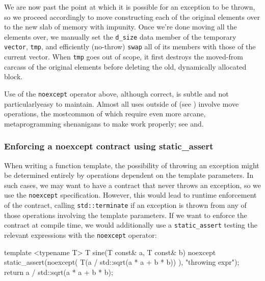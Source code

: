 We are now past the point at which it is possible for an exception to be
thrown, so we proceed accordingly to move constructing each of the
original elements over to the new slab of memory with impunity. Once
we're done moving all the elements over, we manually set the
\lstinline!d_size! data member of the temporary \lstinline!vector!,
\lstinline!tmp!, and efficiently (no-throw) \lstinline!swap! all of its
members with those of the current vector. When \lstinline!tmp! goes out of
scope, it first destroys the moved-from carcass of the original elements
before deleting the old, dynamically allocated block.

Use of the \lstinline!noexcept! operator above, although correct, is subtle
and not particularly\linebreak[4] easy to maintain. Almost all uses outside of
\linebreak[4] (see
) involve move operations, the
most\linebreak[4] common of which require even more arcane, metaprogramming
shenanigans to make work properly; see  and\linebreak[4] .

\subsubsection[Enforcing a \lstinline!noexcept! contract using \lstinline!static_assert!]{Enforcing a {\SubsubsecCode noexcept} contract using {\SubsubsecCode static\_assert}}\label{enforcing-a-noexcept-contract-using-static_assert}

When writing a function template, the possibility of throwing an
exception might be determined entirely by operations dependent on the
template parameters. In such cases, we may want to have a contract that
never throws an exception, so we use the \lstinline!noexcept!
specification. However, this would lead to runtime enforcement of the
contract, calling \lstinline!std::terminate! if an exception is thrown from
any of those operations involving the template parameters. If we want to
enforce the contract at compile time, we would additionally use a
\lstinline!static_assert! testing the relevant expressions with the
\lstinline!noexcept! operator:

\begin{emcppslisting}
template <typename T>
T sine(T const& a, T const& b) noexcept
{
   static_assert(noexcept( T(a / std::sqrt(a * a + b * b)) ), "throwing expr");
   return a / std::sqrt(a * a + b * b);
}
\end{emcppslisting}
    

